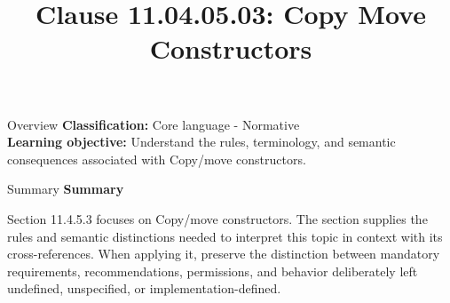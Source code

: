 \documentclass[10pt,letterpaper]{article}
\title{Clause 11.04.05.03: Copy Move Constructors}
\author{}
\date{}
\begin{document}
\maketitle
\begin{CornellOverviewBox}{Overview}
\textbf{Classification:} Core language - Normative\\[2pt]
\textbf{Learning objective:} Understand the rules, terminology, and semantic consequences associated with Copy/move constructors.
\end{CornellOverviewBox}\begin{CornellSummaryBox}{Summary}
{\sffamily\bfseries\color{Accent} Summary}\par\vspace{3pt}Section 11.4.5.3 focuses on Copy/move constructors. The section supplies the rules and semantic distinctions needed to interpret this topic in context with its cross-references. When applying it, preserve the distinction between mandatory requirements, recommendations, permissions, and behavior deliberately left undefined, unspecified, or implementation-defined.
\end{CornellSummaryBox}
\end{document}
